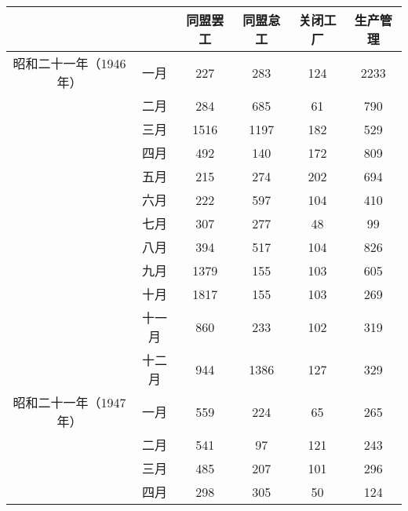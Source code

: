 \documentclass[a4paper,12pt]{article}
\begin{document}
\begin{table}
  \begin{tabular}{|c|c|c|c|c|c|}
    \hline
                           &      & 同盟罢工 & 同盟怠工 & 关闭工厂 & 生产管理 \\ 
    \hline
    昭和二十一年（1946年） & 一月 & 227      & 283      & 124      & 2233     \\ 
    \hline
                           & 二月 & 284      & 685      & 61       & 790      \\ 
    \hline
                           & 三月 & 1516     & 1197     & 182      & 529      \\ 
    \hline
                           & 四月 & 492      & 140      & 172      & 809      \\ 
    \hline                                                                        
                           & 五月 & 215      & 274      & 202      & 694      \\ 
    \hline                                                                        
                           & 六月 & 222      & 597      & 104      & 410      \\ 
    \hline                                                                        
                           & 七月 & 307      & 277      & 48       & 99       \\ 
    \hline                                                                        
                           & 八月 & 394      & 517      & 104      & 826      \\ 
    \hline
                           & 九月 & 1379     & 155      & 103      & 605      \\ 
    \hline
                           & 十月 & 1817     & 155      & 103      & 269      \\ 
    \hline
                         & 十一月 & 860      & 233      & 102      & 319      \\ 
    \hline
                         & 十二月 & 944      & 1386     & 127      & 329      \\ 
    \hline
    昭和二十一年（1947年） & 一月 & 559      & 224      & 65       & 265      \\ 
    \hline
                           & 二月 & 541      & 97       & 121      & 243      \\ 
    \hline
                           & 三月 & 485      & 207      & 101      & 296      \\
    \hline
                           & 四月 & 298      & 305      & 50       & 124      \\ 

\end{tabular}
\end{table}
\end{document}
